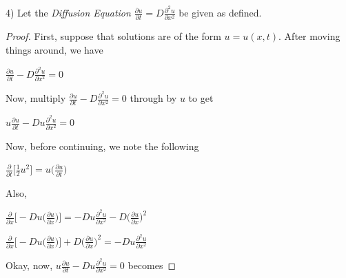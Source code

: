 \documentclass[12pt, executivepaper]{article}
\begin{document}
\begin{flushleft}

4) Let the \textit{Diffusion Equation} $\frac{\partial u}{\partial t}=D\frac{\partial^2 u}{\partial x^2}$ be given as defined. \\

\begin{proof}

First, suppose that solutions are of the form $u=u(x,t)$. After moving things around, we have

\begin{center}

$\frac{\partial u}{\partial t}-D\frac{\partial^2 u}{\partial x^2}=0$

\end{center} 

Now, multiply $\frac{\partial u}{\partial t}-D\frac{\partial^2 u}{\partial x^2}=0$ through by $u$ to get

\begin{center}

$u \frac{\partial u}{\partial t}-Du \frac{\partial^2 u}{\partial x^2}=0$

\end{center}

Now, before continuing, we note the following

\vspace{2mm}

\begin{center}

$\frac{\partial}{\partial t} \bigg[\frac{1}{2} u^2\bigg]=u \bigg(\frac{\partial u}{\partial t}\bigg)$

\end{center}

Also,

\begin{center}

$\frac{\partial}{\partial x} \bigg[-Du \bigg(\frac{\partial u}{\partial x}\bigg) \bigg]=-Du \frac{\partial^2 u}{\partial x^2} -D \bigg(\frac{\partial u}{\partial x}\bigg)^2$

\vspace{2mm}

$\frac{\partial}{\partial x} \bigg[-Du \bigg(\frac{\partial u}{\partial x}\bigg) \bigg]+D \bigg(\frac{\partial u}{\partial x}\bigg)^2=-Du \frac{\partial^2 u}{\partial x^2}$

\end{center}

Okay, now, $u \frac{\partial u}{\partial t}-Du \frac{\partial^2 u}{\partial x^2}=0$ becomes


\end{proof}
\end{flushleft}
\end{document}
